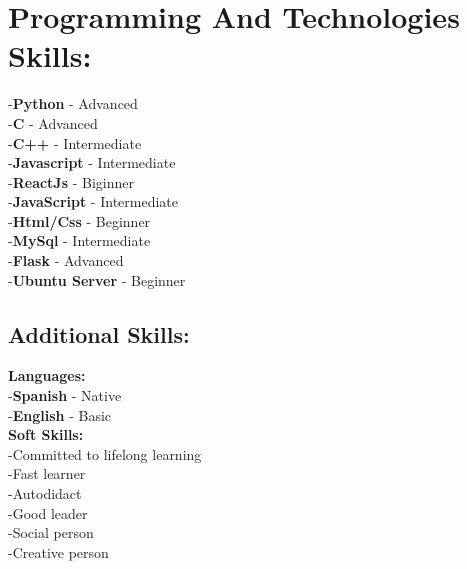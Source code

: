 \documentclass{article}
\begin{document}
\begin{minipage}[t]{8cm}
\begin{itemize}
    \end{itemize}
\section*{Programming And Technologies Skills:}
        -\textbf{Python} - Advanced\\
        -\textbf{C} - Advanced\\
        -\textbf{C++} - Intermediate\\
        -\textbf{Javascript} - Intermediate \\
        -\textbf{ReactJs} - Biginner \\
        -\textbf{JavaScript} - Intermediate \\ 
        -\textbf{Html/Css} - Beginner \\
        -\textbf{MySql} - Intermediate \\
        -\textbf{Flask} - Advanced \\
        -\textbf{Ubuntu Server} - Beginner \\
\subsection*{Additional Skills:}
    \textbf{Languages:}\\
        -\textbf{Spanish} - Native\\
        -\textbf{English} - Basic \\
    \textbf{Soft Skills:}\\
        -Committed to lifelong learning \\
        -Fast learner\\
        -Autodidact\\
        -Good leader\\
        -Social person\\
        -Creative person\\
    

\end{minipage}
\end{document}
